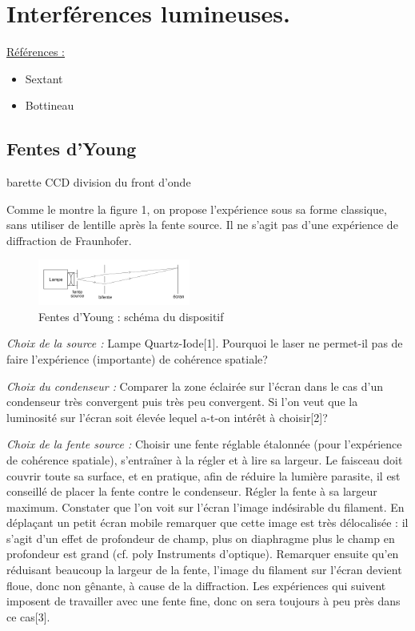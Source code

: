 \documentclass{article}%
\begin{document}
\section{Interférences lumineuses.}
\underline{Références :}
\begin{itemize}
	\item Sextant
	\item  Bottineau
\end{itemize}
\subsection{Fentes d'Young}
barette CCD
division du front d'onde

    Comme le montre la figure 1, on propose l'expérience sous sa forme classique, sans utiliser de lentille après la fente source. Il ne s'agit pas d'une expérience de diffraction de Fraunhofer.
\begin{figure}
	\centerline{\includegraphics[width=5cm]{images-exp/Fentes_Young2.png}}
	\caption{Fentes d'Young : schéma du dispositif}
\end{figure}

    \textit{Choix de la source :}
    Lampe Quartz-Iode[1]. Pourquoi le laser ne permet-il pas de faire l'expérience (importante) de cohérence spatiale?

    \textit{Choix du condenseur :}
    Comparer la zone éclairée sur l'écran dans le cas d'un condenseur très convergent puis très peu convergent. Si l'on veut que la luminosité sur l'écran soit élevée lequel a-t-on intérêt à choisir[2]?

    \textit{Choix de la fente source :}
    Choisir une fente réglable étalonnée (pour l'expérience de cohérence spatiale), s'entraîner à la régler et à lire sa largeur. Le faisceau doit couvrir toute sa surface, et en pratique, afin de réduire la lumière parasite, il est conseillé de placer la fente contre le condenseur. Régler la fente à sa largeur maximum. Constater que l'on voit sur l'écran l'image indésirable du filament. En déplaçant un petit écran mobile remarquer que cette image est très délocalisée : il s'agit d'un effet de profondeur de champ, plus on diaphragme plus le champ en profondeur est grand (cf. poly Instruments d'optique). Remarquer ensuite qu'en réduisant beaucoup la largeur de la fente, l'image du filament sur l'écran devient floue, donc non gênante, à cause de la diffraction. Les expériences qui suivent imposent de travailler avec une fente fine, donc on sera toujours à peu près dans ce cas[3].
\end{document}
